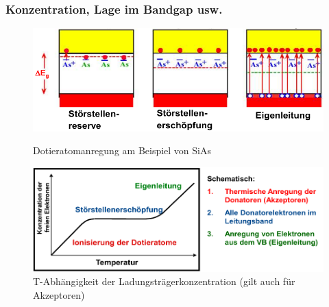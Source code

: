 	\subsubsection{Konzentration, Lage im Bandgap usw.}
		
		
		\begin{figure}[h!]
			\centering
			\begin{minipage}[t]{0.45\linewidth}
				\centering
				\includegraphics[width=1.2\textwidth]{Kapitel/Kap02/tempAbhSiAs.PNG}
				\caption{Dotieratomanregung am Beispiel von SiAs}
				\label{02_tempAbh}
			\end{minipage}%
			\hfill
			\begin{minipage}[t]{0.45\linewidth}
				\centering
				\includegraphics[width=1.2\textwidth]{Kapitel/Kap02/ladungstraegerkonzentration.PNG}
				\caption{T-Abhängigkeit der Ladungsträgerkonzentration (gilt auch für Akzeptoren)}
				\label{02_tempAbh2}
			\end{minipage}
		\end{figure}
		
